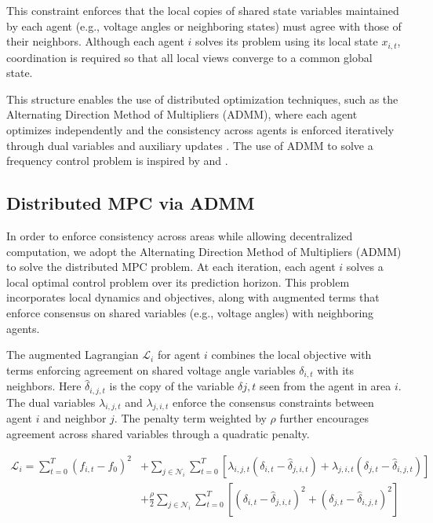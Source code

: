 \documentclass{article}
\begin{document}
This constraint enforces that the local copies of shared state variables maintained by each agent (e.g., voltage angles or neighboring states) must agree with those of their neighbors. Although each agent $i$ solves its problem using its local state $x_{i,t}$, coordination is required so that all local views converge to a common global state.

This structure enables the use of distributed optimization techniques, such as the Alternating Direction Method of Multipliers (ADMM), where each agent optimizes independently and the consistency across agents is enforced iteratively through dual variables and auxiliary updates \cite{ADMM:boyd}. The use of ADMM to solve a frequency control problem is inspired by \cite{paper:DMPC} and \cite{paper:marco}.

\subsection{Distributed MPC via ADMM}

In order to enforce consistency across areas while allowing decentralized computation, we adopt the Alternating Direction Method of Multipliers (ADMM) to solve the distributed MPC problem. At each iteration, each agent $i$ solves a local optimal control problem over its prediction horizon. This problem incorporates local dynamics and objectives, along with augmented terms that enforce consensus on shared variables (e.g., voltage angles) with neighboring agents.

The augmented Lagrangian $\mathcal{L}_i$ for agent $i$ combines the local objective with terms enforcing agreement on shared voltage angle variables $\delta_{i,t}$ with its neighbors. Here $\hat{\delta}_{i,j,t}$ is the copy of the variable $\delta{j,t}$ seen from the agent in area $i$. The dual variables $\lambda_{i,j,t}$ and $\lambda_{j,i,t}$ enforce the consensus constraints between agent $i$ and neighbor $j$. The penalty term weighted by $\rho$ further encourages agreement across shared variables through a quadratic penalty.
 
\begin{align}
    \mathcal{L}_i = \sum_{t=0}^{T} (f_{i,t} - f_0)^2 &+ \sum_{j \in \mathcal{N}_i} \sum_{t=0}^T \left[ \lambda_{i,j,t} (\delta_{i,t} - \hat{\delta}_{j,i,t}) + \lambda_{j,i,t} (\delta_{j,t} - \hat{\delta}_{i,j,t}) \right] \nonumber \\
    &+ \frac{\rho}{2} \sum_{j \in \mathcal{N}_i} \sum_{t=0}^T \left[ (\delta_{i,t} - \hat{\delta}_{j,i,t})^2 + (\delta_{j,t} - \hat{\delta}_{i,j,t})^2 \right]
\end{align}
\end{document}
